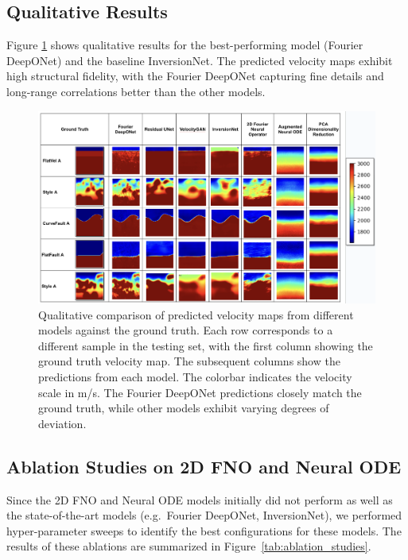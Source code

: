 \documentclass{article}
\begin{document}
\subsection{Qualitative Results}

Figure \ref{fig:qualitative_results} shows qualitative results for the best-performing model (Fourier DeepONet) and the baseline InversionNet. The predicted velocity maps exhibit high structural fidelity, with the Fourier DeepONet capturing fine details and long-range correlations better than the other models.

\begin{figure}
    \centering
    \includegraphics[width=\linewidth]{figures/qualitative_results.png}
    \caption{Qualitative comparison of predicted velocity maps from different models against the ground truth. Each row corresponds to a different sample in the testing set, with the first column showing the ground truth velocity map. The subsequent columns show the predictions from each model. The colorbar indicates the velocity scale in m/s. The Fourier DeepONet predictions closely match the ground truth, while other models exhibit varying degrees of deviation.}
    \label{fig:qualitative_results}
\end{figure}

\subsection{Ablation Studies on 2D FNO and Neural ODE}

Since the 2D FNO and Neural ODE models initially did not perform as well as the state-of-the-art models (e.g.\ Fourier DeepONet, InversionNet), we performed hyper-parameter sweeps to identify the best configurations for these models. The results of these ablations are summarized in Figure~\ref{tab:ablation_studies}.
\end{document}
